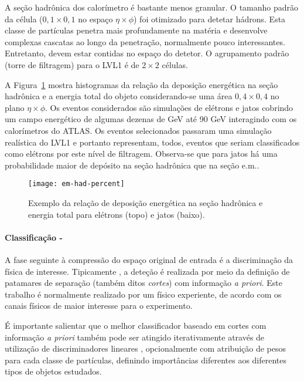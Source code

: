 A seção hadrônica dos calorímetro é bastante menos granular. O tamanho padrão
da célula ($0,1\times0,1$ no espaço $\eta\times\phi$) foi otimizado para
detetar hádrons. Esta classe de partículas penetra mais profundamente na
matéria e desenvolve complexas cascatas ao longo da penetração, normalmente
pouco interessantes. Entretanto, devem estar contidas no espaço do detetor. O
agrupamento padrão (torre de filtragem) para o LVL1 é de $2\times2$ células.

A Figura~\ref{fig:e-jet-deposit} mostra histogramas da relação da deposição
energética na seção hadrônica e a energia total do objeto considerando-se uma
área $0,4\times0,4$ no plano $\eta\times\phi$. Os eventos considerados são
simulações de elétrons e jatos cobrindo um campo energético de algumas dezenas
de GeV até 90 GeV interagindo com os calorímetros do ATLAS. Os eventos
selecionados passaram uma simulação realística do LVL1 e portanto representam,
todos, eventos que seriam classificados como elétrons por este nível de
filtragem. Observa-se que para jatos há uma probabilidade maior de depósito na
seção hadrônica que na seção e.m..

\begin{figure}
\begin{center}
\texttt{[image: em-had-percent]}
\end{center}
\caption{Exemplo da relação de deposição energética na seção hadrônica e
energia total para elétrons (topo) e jatos (baixo).}
\label{fig:e-jet-deposit}
\end{figure}

\paragraph{Classificação -} A fase seguinte à compressão do espaço original
de entrada é a discriminação da física de interesse. Tipicamente
\cite{hlt-tdr, zeus-neural}, a deteção é realizada por meio da definição de
patamares de separação (também ditos \emph{cortes}) com informação \emph{a
priori}. Este trabalho é normalmente realizado por um físico experiente, de
acordo com os canais físicos de maior interesse para o experimento.

É importante salientar que o melhor classificador baseado em cortes com
informação \emph{a priori} também pode ser atingido iterativamente através de
utilização de discriminadores lineares \cite{haykin-adaptative}, opcionalmente
com atribuição de pesos para cada classe de partículas, definindo importâncias
diferentes aos diferentes tipos de objetos estudados.

